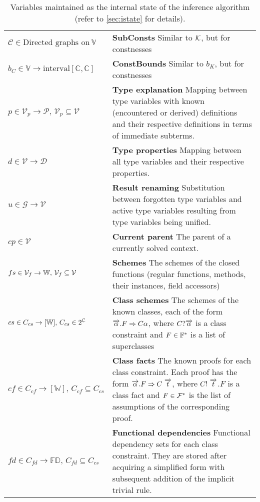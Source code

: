 \begin{table}
\begin{tabular}{p{.23\linewidth}p{.7\linewidth}}
  $\mathcal{C} \in \text{Directed graphs on}\ \mathbb{V}$ & \textbf{SubConsts}\quad
  Similar to $\mathcal{K}$, but for constnesses \\

  $b_C \in \mathbb{V} \to \text{interval} \left[\mathbb{C}, \mathbb{C}\right]$ & \textbf{ConstBounds}\quad
  Similar to $b_K$, but for constnesses \\

  $p \in \mathcal{V}_p \to \mathcal{P},\,\mathcal{V}_p \subseteq \mathcal{V}$ & \textbf{Type explanation}\quad
  Mapping between type variables with known (encountered or derived) definitions and their respective definitions in terms of immediate subterms. \\

  $d \in \mathcal{V} \to \mathcal{D}$ & \textbf{Type properties}\quad
  Mapping between all type variables and their respective properties. \\

  $u \in \mathcal{G} \to \mathcal{V}$ & \textbf{Result renaming}\quad
  Substitution between forgotten type variables and active type variables resulting from type variables being unified. \\

  $cp \in \mathcal{V}$ & \textbf{Current parent}\quad
  The parent of a currently solved context. \\

  $fs \in \mathcal{V}_f \to \mathbb{W},\,\mathcal V_f \subseteq \mathcal V$ & \textbf{Schemes}\quad
  The schemes of the closed functions (regular functions, methods, their instances, field accessors) \\

  $cs \in C_{cs} \to [\mathbb{W}],\,C_{cs} \in 2^{\mathbb{C}}$ & \textbf{Class schemes}\quad
  The schemes of the known classes, each of the form $\overrightarrow{\alpha} . F \Rightarrow C \alpha$, where $C?  \overrightarrow{\alpha}$ is a class constraint and $F \in {\mathbb{F}}^\ast$ is a list of superclasses \\

  $cf \in C_{cf} \to [\mathbb{W}],\,C_{cf} \subseteq C_{cs}$ & \textbf{Class facts}\quad
  The known proofs for each class constraint. Each proof has the form $\overrightarrow{\alpha} . F \Rightarrow C\ \overrightarrow{t}$, where $C!\ \overrightarrow{t}$.$F$ is a class fact and $F \in {\mathcal F}^\ast$ is the list of assumptions of the corresponding proof. \\

  $fd \in C_{fd} \to \mathbb{FD},\,C_{fd} \subseteq C_{cs}$ & \textbf{Functional dependencies}\quad
  Functional dependency sets for each class constraint. They are stored after acquiring a simplified form with subsequent addition of the implicit trivial rule. \\
\bottomrule
\end{tabular}
\caption{Variables maintained as the internal state of the inference algorithm (refer to \cref{sec:istate} for details).}
\label{tab:istate}
\end{table}

